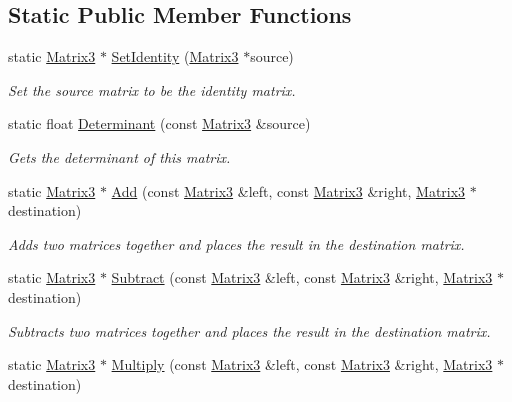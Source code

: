 \subsection*{Static Public Member Functions}
\begin{DoxyCompactItemize}
\item 
static \hyperlink{class_flounder_1_1_matrix3}{Matrix3} $\ast$ \hyperlink{class_flounder_1_1_matrix3_ac246a72e7676089a6aa05f33f732d7bc}{Set\+Identity} (\hyperlink{class_flounder_1_1_matrix3}{Matrix3} $\ast$source)
\begin{DoxyCompactList}\small\item\em Set the source matrix to be the identity matrix. \end{DoxyCompactList}\item 
static float \hyperlink{class_flounder_1_1_matrix3_a0933e566ba04b985debf8d5b02b969c9}{Determinant} (const \hyperlink{class_flounder_1_1_matrix3}{Matrix3} \&source)
\begin{DoxyCompactList}\small\item\em Gets the determinant of this matrix. \end{DoxyCompactList}\item 
static \hyperlink{class_flounder_1_1_matrix3}{Matrix3} $\ast$ \hyperlink{class_flounder_1_1_matrix3_adb3c2ad1292e3c6f82ef98b1b107f6b0}{Add} (const \hyperlink{class_flounder_1_1_matrix3}{Matrix3} \&left, const \hyperlink{class_flounder_1_1_matrix3}{Matrix3} \&right, \hyperlink{class_flounder_1_1_matrix3}{Matrix3} $\ast$destination)
\begin{DoxyCompactList}\small\item\em Adds two matrices together and places the result in the destination matrix. \end{DoxyCompactList}\item 
static \hyperlink{class_flounder_1_1_matrix3}{Matrix3} $\ast$ \hyperlink{class_flounder_1_1_matrix3_aad026f1d41ae3d78b008c362febb6512}{Subtract} (const \hyperlink{class_flounder_1_1_matrix3}{Matrix3} \&left, const \hyperlink{class_flounder_1_1_matrix3}{Matrix3} \&right, \hyperlink{class_flounder_1_1_matrix3}{Matrix3} $\ast$destination)
\begin{DoxyCompactList}\small\item\em Subtracts two matrices together and places the result in the destination matrix. \end{DoxyCompactList}\item 
static \hyperlink{class_flounder_1_1_matrix3}{Matrix3} $\ast$ \hyperlink{class_flounder_1_1_matrix3_a91c2860023e1e5ef22fdef714eded8d6}{Multiply} (const \hyperlink{class_flounder_1_1_matrix3}{Matrix3} \&left, const \hyperlink{class_flounder_1_1_matrix3}{Matrix3} \&right, \hyperlink{class_flounder_1_1_matrix3}{Matrix3} $\ast$destination)

\end{DoxyCompactItemize}
